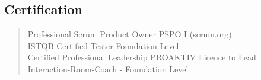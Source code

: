 \subsection*{Certification}
%
\begin{quote}
		Professional Scrum Product Owner PSPO I (scrum.org)\\
		ISTQB Certified Tester Foundation Level\\
		Certified Professional Leadership PROAKTIV Licence to Lead\\
		Interaction-Room-Coach - Foundation Level
\end{quote}
